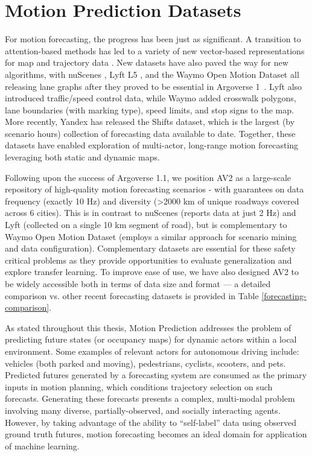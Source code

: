 \section{Motion Prediction Datasets}
\label{sec:5_motion_prediction_datasets}

For motion forecasting, the progress has been just as significant. A transition to attention-based methods \cite{Mercat19arxiv_MultiheadAttentionForecasting, Mercat20icra_MultiheadAttentionForecasting} has led to a variety of new vector-based representations for map and trajectory data \cite{Gao20cvpr_VectorNet,Liang20eccv_LaneGCN}. New datasets have also paved the way for new algorithms, with nuScenes \cite{Caesar20cvpr_NuScenes}, Lyft L5 \cite{Houston20arxiv_LyftL5}, and the Waymo Open Motion Dataset \cite{Ettinger21arxiv_WaymoOpenMotion} all releasing lane graphs after they proved to be essential in Argoverse 1~\cite{Chang19cvpr_Argoverse}. Lyft  also introduced traffic/speed control data, while Waymo added crosswalk polygons, lane boundaries (with marking type), speed limits, and stop signs to the map. More recently, Yandex has released the Shifts \cite{Malinin21arxiv_ShiftsYandex} dataset, which is the largest (by scenario hours) collection of forecasting data available to date. Together, these datasets have enabled exploration of multi-actor, long-range motion forecasting leveraging both static and dynamic maps.

Following upon the success of Argoverse 1.1, we position AV2 as a large-scale repository of high-quality motion forecasting scenarios - with guarantees on data frequency (exactly 10 Hz) and diversity (>2000 km of unique roadways covered across 6 cities). This is in contrast to nuScenes (reports data at just 2 Hz) and Lyft (collected on a single 10 km segment of road), but is complementary to Waymo Open Motion Dataset (employs a similar approach for scenario mining and data configuration). Complementary datasets are essential for these safety critical problems as they provide opportunities to evaluate generalization and explore transfer learning. To improve ease of use, we have also designed AV2 to be widely accessible both in terms of data size and format --- a detailed comparison vs. other recent forecasting datasets is provided in Table \ref{forecasting-comparison}.

As stated throughout this thesis, Motion Prediction addresses the problem of predicting future states (or occupancy maps) for dynamic actors within a local environment. Some examples of relevant actors for autonomous driving include: vehicles (both parked and moving), pedestrians, cyclists, scooters, and pets. Predicted futures generated by a forecasting system are consumed as the primary inputs in motion planning, which conditions trajectory selection on such forecasts. Generating these forecasts presents a complex, multi-modal problem involving many diverse, partially-observed, and socially interacting agents. However, by taking advantage of the ability to ``self-label'' data using observed ground truth futures, motion forecasting becomes an ideal domain for application of machine learning. 

